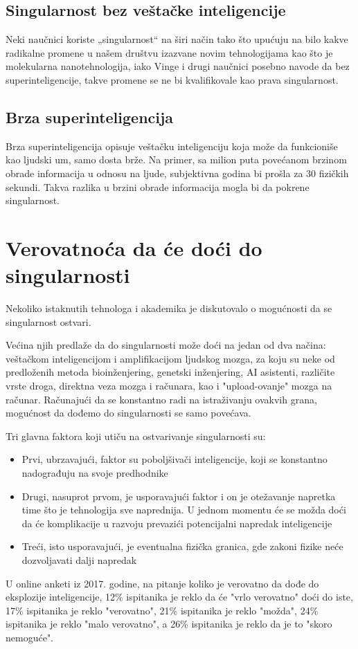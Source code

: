 \documentclass[a4paper]{article}
\begin{document}
\subsection{Singularnost bez veštačke inteligencije}

Neki naučnici koriste „singularnost“ na širi način tako što upućuju na bilo kakve radikalne promene u našem društvu izazvane novim tehnologijama kao što je molekularna nanotehnologija,\cite{ref 9}\cite{ref 10}\cite{ref 11} iako Vinge i drugi naučnici posebno navode da bez superinteligencije, takve promene se ne bi kvalifikovale kao prava singularnost.

\subsection{Brza superinteligencija}
Brza superinteligencija opisuje veštačku inteligenciju koja može da funkcioniše kao ljudski um, samo dosta brže.\cite{ref 12} Na primer, sa milion puta povećanom brzinom obrade informacija u odnosu na ljude, subjektivna godina bi prošla za 30 fizičkih sekundi. Takva razlika u brzini obrade informacija mogla bi da pokrene singularnost.

\section{Verovatnoća da će doći do singularnosti}	
\label{sec:verovatnoća}
Nekoliko istaknutih tehnologa i akademika je diskutovalo o mogućnosti da se singularnost ostvari. 

Većina njih predlaže da do singularnosti može doći na jedan od dva načina: veštačkom inteligencijom i amplifikacijom ljudskog mozga, za koju su neke od predloženih metoda bioinženjering, genetski inženjering, AI asistenti, različite vrste droga, direktna veza mozga i računara, kao i "upload-ovanje" mozga na računar. Računajući da se konstantno radi na istraživanju ovakvih grana, mogućnost da dođemo do singularnosti se samo povećava. \cite{mog-1}

Tri glavna faktora koji utiču na ostvarivanje singularnosti su: \cite{mog-2}
\begin{itemize}
\item Prvi, ubrzavajući, faktor su poboljšivači inteligencije, koji se konstantno nadograđuju na svoje predhodnike 
\item Drugi, nasuprot prvom, je usporavajući faktor i on je otežavanje napretka time što je tehnologija sve naprednija. U jednom momentu će se možda doći da će komplikacije u razvoju prevazići potencijalni napredak inteligencije
\item Treći, isto usporavajući, je eventualna fizička granica, gde zakoni fizike neće dozvoljavati dalji napredak  
\end{itemize} 
U online anketi iz 2017. godine, na pitanje koliko je verovatno da dođe do eksplozije inteligencije, 12\% ispitanika je reklo da će "vrlo verovatno" doći do iste, 17\% ispitanika je reklo "verovatno", 21\% ispitanika je reklo "možda", 24\% ispitanika je reklo "malo verovatno", a 26\% ispitanika je reklo da je to "skoro nemoguće". \cite{mog-3}
\end{document}
